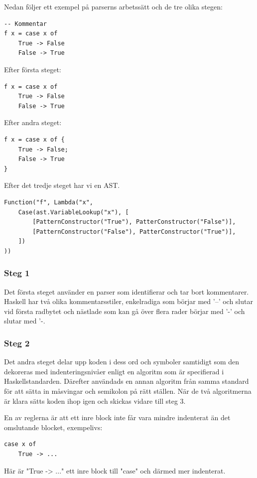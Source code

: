 Nedan följer ett exempel på parserns arbetssätt och de tre olika stegen:
\begin{lstlisting}
-- Kommentar
f x = case x of
    True -> False
    False -> True
\end{lstlisting}

Efter första steget:
\begin{lstlisting}
f x = case x of
    True -> False
    False -> True
\end{lstlisting}

Efter andra steget:
\begin{lstlisting}
f x = case x of {
    True -> False;
    False -> True
}
\end{lstlisting}

Efter det tredje steget har vi en AST.
\begin{lstlisting}
Function("f", Lambda("x", 
    Case(ast.VariableLookup("x"), [
        [PatternConstructor("True"), PatterConstructor("False")],
        [PatternConstructor("False"), PatterConstructor("True")],
    ])
))
\end{lstlisting}

\subsubsection{Steg 1}
Det första steget använder en parser som identifierar och tar bort kommentarer. 
Haskell har två olika kommentarsstiler, enkelradiga som börjar med '--' och slutar vid första radbytet och 
nästlade som kan gå över flera rader börjar med '{-' och slutar med '-}.

\subsubsection{Steg 2}
Det andra steget delar upp koden i dess ord och symboler samtidigt som den dekoreras med indenteringsnivåer enligt en algoritm 
som är specifierad i Haskellstandarden. Därefter användads en annan algoritm från samma standard för att sätta in måsvingar och semikolon på rätt ställen. 
När de två algoritmerna är klara sätts koden ihop igen och skickas vidare till steg 3.

En av reglerna är att ett inre block inte får vara mindre indenterat än det omslutande blocket, exempelivs:
\begin{lstlisting}
case x of
    True -> ...
\end{lstlisting}
Här är "True -> ..." ett inre block till "case" och därmed mer indenterat.

